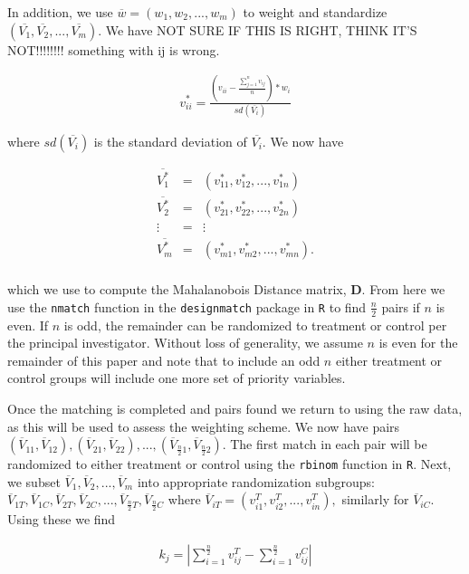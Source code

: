 \documentclass[]{sagej}
\begin{document}
In addition, we use \(\overline{w} = (w_{1}, w_{2},..., w_{m})\) to
weight and standardize
\((\overline{V_1}, \overline{V_2}, ..., \overline{V_m}).\) We have NOT
SURE IF THIS IS RIGHT, THINK IT'S NOT!!!!!!!! something with ij is
wrong.

\begin{eqnarray*}
v^{*}_{ii} = \frac{(v_{ii} - \frac{\sum _{j=1}^{n}v_{ij}}{n})*w_i}{sd(\overline{V_i})} 
 \end{eqnarray*}

where \(sd(\overline{V_i})\) is the standard deviation of
\(\overline{V_i}.\) We now have

\begin{eqnarray*}
 \overline{V_1^*} & = & (v_{11}^*, v_{12}^*,..., v_{1n}^*)\\
 \overline{V_2^*} & = & (v_{21}^*, v_{22}^*,..., v_{2n}^*)\\
 \vdots & = & \vdots\\    
 \overline{V_m^*} & = & (v_{m1}^*, v_{m2}^*,..., v_{mn}^*).\\
 \end{eqnarray*}

which we use to compute the Mahalanobois Distance matrix, \textbf{D}.
From here we use the \texttt{nmatch} function in the
\texttt{designmatch} package in \texttt{R} to find \(\frac{n}{2}\) pairs
if \(n\) is even. If \(n\) is odd, the remainder can be randomized to
treatment or control per the principal investigator. Without loss of
generality, we assume \(n\) is even for the remainder of this paper and
note that to include an odd \(n\) either treatment or control groups
will include one more set of priority variables.

Once the matching is completed and pairs found we return to using the
raw data, as this will be used to assess the weighting scheme. We now
have pairs
\((\overline{V}_{11}, \overline{V}_{12}), (\overline{V}_{21}, \overline{V}_{22}), ..., (\overline{V}_{\frac{n}{2}1}, \overline{V}_{\frac{n}{2}2}).\)
The first match in each pair will be randomized to either treatment or
control using the \texttt{rbinom} function in \texttt{R}. Next, we
subset \(\overline{V}_1, \overline{V}_2, ..., \overline{V}_m\) into
appropriate randomization subgroups:
\(\overline{V}_{1T}, \overline{V}_{1C}, \overline{V}_{2T}, \overline{V}_{2C},..., \overline{V}_{\frac{n}{2}T}, \overline{V}_{\frac{n}{2}C}\)
where \(\overline{V}_{iT} = (v_{i1}^T, v_{i2}^T,..., v_{in}^T),\)
similarly for \(\overline{V}_{iC}.\) Using these we find

\begin{eqnarray*}
 k_j = | \sum_{i = 1}^{\frac{n}{2}}v_{ij}^T - \sum_{i = 1}^{\frac{n}{2}}v_{ij}^C | 
\end{eqnarray*}
\end{document}
